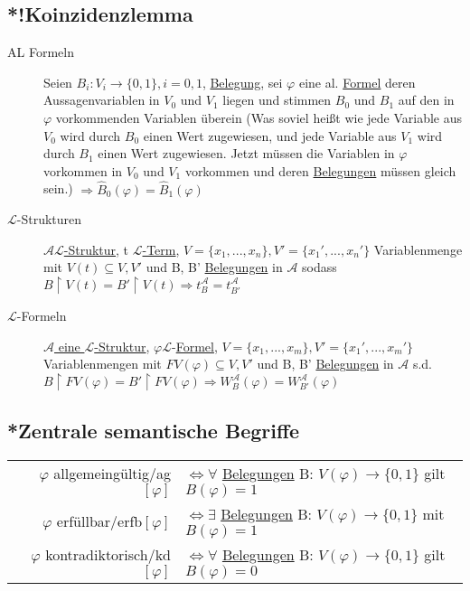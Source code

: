 \documentclass[12pt,a4paper]{article} %
\begin{document}
	\subsection{*!Koinzidenzlemma}
	\begin{description}
		\item[AL Formeln] Seien $B_i : V_i \rightarrow \{0, 1\}, i = 0, 1$, \hyperref[Belegung]{Belegung}, sei $\varphi$ eine al. \hyperref[Formel]{Formel} deren Aussagenvariablen in $V_0$ und $V_1$ liegen und stimmen $B_0$ und $B_1$ auf den in $\varphi$ vorkommenden Variablen überein (Was soviel heißt wie jede Variable aus $V_0$ wird durch $B_0$ einen Wert zugewiesen, und jede Variable aus $V_1$ wird durch $B_1$ einen Wert zugewiesen. Jetzt müssen die Variablen in $\varphi$ vorkommen in $V_0$ und $V_1$ vorkommen und deren \hyperref[Belegung]{Belegungen} müssen gleich sein.) $\Rightarrow \widehat{B}_0(\varphi) = \widehat{B}_1(\varphi)$
		\item[$\mathcal{L}$-Strukturen] \hyperref[Struktur]{$\mathcal{A} \mathcal{L}$-Struktur}, t \hyperref[Term]{$\mathcal{L}$-Term}, $V = \{x_1, ..., x_n\}, V' = \{x_1', ..., x_n'\}$ Variablenmenge mit $V(t)\subseteq V, V'$ und B, B' \hyperref[Belegung]{Belegungen} in $\mathcal{A}$ sodass $B \upharpoonright V(t) = B' \upharpoonright V(t) \Rightarrow t_B^{\mathcal{A}} = t_{B'}^{\mathcal{A}}$
		\item[$\mathcal{L}$-Formeln] \hyperref[Struktur]{$\mathcal{A}$ eine $\mathcal{L}$-Struktur}, $\varphi \mathcal{L}$-\hyperref[Formel]{Formel}, $V = \{x_1, ..., x_m\}, V' = \{x_1', ..., x_m'\}$ Variablenmengen mit $FV(\varphi) \subseteq V, V'$ und B, B' \hyperref[Belegung]{Belegungen} in $\mathcal{A}$ s.d. $B \upharpoonright FV(\varphi) = B' \upharpoonright FV(\varphi) \Rightarrow W_B^{\mathcal{A}}(\varphi) = W_{B'}^{\mathcal{A}}(\varphi)$ 
	\end{description}
	
	\subsection{*Zentrale semantische Begriffe}
	\begin{tabular}{r l}
		$\varphi$ allgemeingültig/ag$[\varphi]$ & $\Leftrightarrow \forall$ \hyperref[Belegung]{Belegungen} B: $V(\varphi) \rightarrow \{0, 1\}$ gilt $B(\varphi) = 1$ \\
		$\varphi$ erfüllbar/erfb$[\varphi]$ & $\Leftrightarrow \exists$ \hyperref[Belegung]{Belegungen} B: $V(\varphi) \rightarrow \{0, 1\}$ mit $B(\varphi) = 1$ \\
		$\varphi$ kontradiktorisch/kd$[\varphi]$ & $\Leftrightarrow \forall$ \hyperref[Belegung]{Belegungen} B: $V(\varphi) \rightarrow \{0, 1\}$ gilt $B(\varphi) = 0$ 
	\end{tabular}
	
\end{document}

